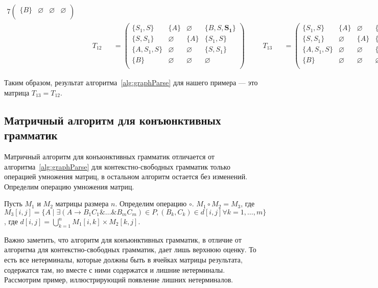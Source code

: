 \begin{example}
\begin{alignat*}{7}
\begin{pmatrix}
\{B\}       & \varnothing & \varnothing & \varnothing \\
\end{pmatrix} \\ & &&T_{12} &&= \begin{pmatrix}
\{S_1, S\}     & \{A\}       & \varnothing & \{B, S, \pmb{S_1}\}    \\
\{S, S_1\}       & \varnothing & \{A\}       & \{S_1, S\}     \\
\{A, S_1, S\}  & \varnothing & \varnothing & \{S, S_1\} \\
\{B\}       & \varnothing & \varnothing & \varnothing \\
\end{pmatrix} \ \ \ \ &&T_{13} &&= \begin{pmatrix}
\{S_1, S\}     & \{A\}       & \varnothing & \{B, S, S_1\}    \\
\{S, S_1\}       & \varnothing & \{A\}       & \{S_1, S\}     \\
\{A, S_1, S\}  & \varnothing & \varnothing & \{S, S_1\} \\
\{B\}       & \varnothing & \varnothing & \varnothing \\
\end{pmatrix}
\end{alignat*}

Таким образом, результат алгоритма~\ref{alg:graphParse} для нашего примера --- это матрица $T_{13} = T_{12}$. 

\end{example}


\subsection{Матричный алгоритм для конъюнктивных грамматик}

Матричный алгоритм для конъюнктивных грамматик отличается от алгоритма~\ref{alg:graphParse} для контекстно-свободных грамматик только операцией умножения матриц, в остальном алгоритм остается без изменений. Определим операцию умножения матриц.
\begin{definition}
    Пусть $M_1$ и $M_2$ матрицы размера $n$. Определим операцию $\circ$. $M_1 \circ M_2 = M_3$, где $M_3 [i,j] = \{A \mid \exists (A \rightarrow B_1 C_1 \& \ldots \& B_m C_m) \in P, (B_k , C_k) \in d[i,j] \forall k = 1,\ldots,m\}$, где $d[i,j] = \bigcup_{k = 1}^{n} M_1 [i,k] \times M_2 [k,j]$.
\end{definition}

Важно заметить, что алгоритм для конъюнктивных грамматик, в отличие от алгоритма для контекстно-свободных грамматик, дает лишь верхнюю оценку. То есть все нетерминалы, которые должны быть в ячейках матрицы результата, содержатся там, но вместе с ними содержатся и лишние нетерминалы. Рассмотрим пример, иллюстрирующий появление лишних нетерминалов.

